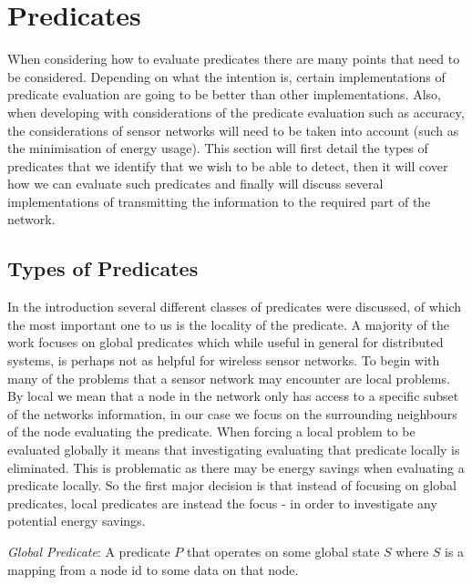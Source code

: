 
\section{Predicates}

When considering how to evaluate predicates there are many points that need to be considered. Depending on what the intention is, certain implementations of predicate evaluation are going to be better than other implementations. Also, when developing with considerations of the predicate evaluation such as accuracy, the considerations of sensor networks will need to be taken into account (such as the minimisation of energy usage). This section will first detail the types of predicates that we identify that we wish to be able to detect, then it will cover how we can evaluate such predicates and finally will discuss several implementations of transmitting the information to the required part of the network.

\subsection{Types of Predicates}

In the introduction several different classes of predicates were discussed, of which the most important one to us is the locality of the predicate. A majority of the work focuses on global predicates \cite{277788,345831,553309} which while useful in general for distributed systems, is perhaps not as helpful for wireless sensor networks. To begin with many of the problems that a sensor network may encounter are local problems. By local we mean that a node in the network only has access to a specific subset of the networks information, in our case we focus on the surrounding neighbours of the node evaluating the predicate. When forcing a local problem to be evaluated globally it means that investigating evaluating that predicate locally is eliminated. This is problematic as there may be energy savings when evaluating a predicate locally. So the first major decision is that instead of focusing on global predicates, local predicates are instead the focus - in order to investigate any potential energy savings.

\begin{mydef}
\emph{Global Predicate}: A predicate $P$ that operates on some global state $S$ where $S$ is a mapping from a node id to some data on that node.
\end{mydef}

